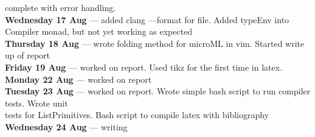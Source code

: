 complete with error handling. \\
\textbf{Wednesday 17 Aug}  --- added clang  ---format for file. Added typeEnv into Compiler monad, but not yet working as expected \\
\textbf{Thursday 18 Aug}  --- wrote folding method for microML in vim. Started write up of report \\
\textbf{Friday 19 Aug}  --- worked on report. Used tikz for the first time in latex. \\
\textbf{Monday 22 Aug}  --- worked on report \\
\textbf{Tuesday 23 Aug}  --- worked on report. Wrote simple bash script to run compiler tests. Wrote unit \\
                   tests for ListPrimitives. Bash script to compile latex with bibliography \\
\textbf{Wednesday 24 Aug}  --- writing \\
